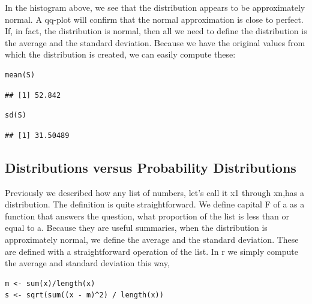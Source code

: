 \documentclass[
]{article}
\begin{document}
In the histogram above, we see that the distribution appears to be
approximately normal. A qq-plot will confirm that the normal
approximation is close to perfect. If, in fact, the distribution is
normal, then all we need to define the distribution is the average and
the standard deviation. Because we have the original values from which
the distribution is created, we can easily compute these:

\begin{verbatim}
mean(S)
\end{verbatim}

\begin{verbatim}
## [1] 52.842
\end{verbatim}

\begin{verbatim}
sd(S)
\end{verbatim}

\begin{verbatim}
## [1] 31.50489
\end{verbatim}

\hypertarget{distributions-versus-probability-distributions}{%
\subsection{Distributions versus Probability
Distributions}\label{distributions-versus-probability-distributions}}

Previously we described how any list of numbers, let's call it x1
through xn,has a distribution. The definition is quite straightforward.
We define capital F of a as a function that answers the question, what
proportion of the list is less than or equal to a. Because they are
useful summaries, when the distribution is approximately normal, we
define the average and the standard deviation. These are defined with a
straightforward operation of the list. In r we simply compute the
average and standard deviation this way,

\begin{verbatim}
m <- sum(x)/length(x)
s <- sqrt(sum((x - m)^2) / length(x))
\end{verbatim}
\end{document}

